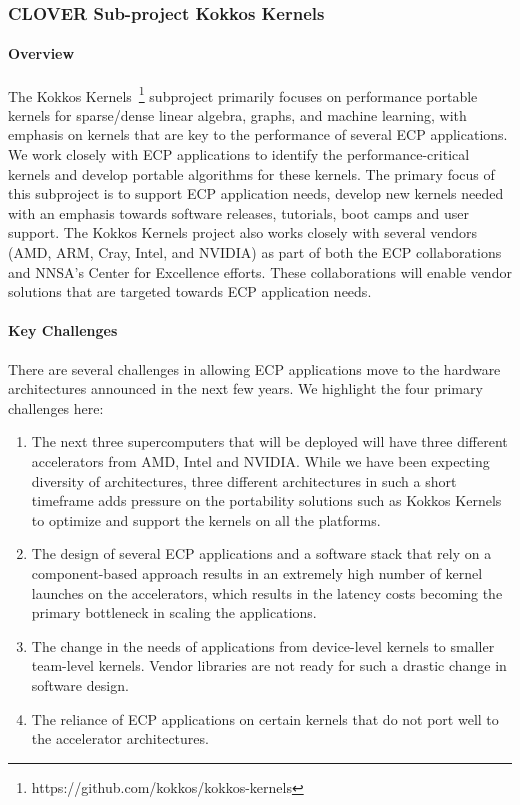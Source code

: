 \subsubsection{ CLOVER Sub-project Kokkos Kernels} 
\paragraph{Overview} 
The Kokkos Kernels~\footnote{https://github.com/kokkos/kokkos-kernels} subproject primarily focuses on performance portable kernels
for sparse/dense linear algebra, graphs, and machine learning, with emphasis on
kernels that are key to the performance of
several ECP applications. We work closely with ECP applications to identify the
performance-critical kernels and develop portable algorithms for these kernels.
The primary focus of this subproject is to support ECP application needs, develop new
kernels needed with an emphasis towards software releases, tutorials, boot camps
and user support. The Kokkos Kernels project also works closely with several vendors
(AMD, ARM, Cray, Intel, and NVIDIA) as part of both the ECP collaborations and
NNSA's Center for Excellence efforts. These collaborations will  enable vendor solutions
that are targeted towards ECP application needs.

\paragraph{Key  Challenges}
There are several challenges in allowing ECP applications move to the hardware architectures
announced in the next few years. We highlight the four primary challenges here:
\begin{enumerate}
\item 
The next three supercomputers that will be deployed will have
three different accelerators from AMD, Intel and NVIDIA. While we have been expecting diversity of architectures, three
different architectures in such a short timeframe adds pressure on the portability
solutions such as Kokkos Kernels to optimize and support the kernels on all the platforms.
\item
The design of several ECP applications and a software stack that rely on a component-based
approach results in an extremely high number of kernel launches on the accelerators, which
results in the latency costs becoming the primary bottleneck in scaling the applications.
\item
The change in the needs of applications from device-level kernels to smaller team-level kernels. Vendor
libraries are not ready for such a drastic change in software design.
\item 
The reliance of ECP applications on certain kernels that do not port well to the  accelerator architectures.
\end{enumerate}

